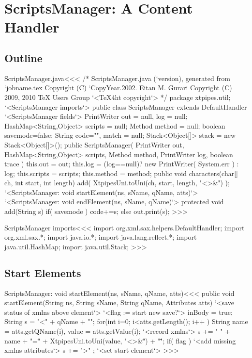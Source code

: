 \documentclass{article}
\begin{document}
\section{ScriptsManager: A Content Handler}

\label{ScriptsManager}


\subsection{Outline}


\<ScriptsManager.java\><<<
/* ScriptsManager.java (`version), generated from `jobname.tex
   Copyright (C) `CopyYear.2002. Eitan M. Gurari
   Copyright (C) 2009, 2010 TeX Users Group
`<TeX4ht copyright`> */
package xtpipes.util;
`<ScriptsManager imports`>
public class ScriptsManager extends DefaultHandler {
     `<ScriptsManager fields`>
     PrintWriter out = null, log = null;
     HashMap<String,Object> scripts = null;
     Method method = null;
     boolean savemode=false;
     String code="", match = null;
     Stack<Object[]> stack = new Stack<Object[]>();
   public ScriptsManager( PrintWriter out,
                          HashMap<String,Object> scripts,
                          Method method,
                          PrintWriter log, boolean trace ){
     this.out = out;
     this.log = (log==null)? new PrintWriter( System.err ) : log;
     this.scripts = scripts;
     this.method = method;
   }
   public void characters(char[] ch, int start, int length){
     add( XtpipesUni.toUni(ch, start, length, "<>&") );
   }
   `<ScriptsManager: void startElement(ns, sName, qName, atts)`>
   `<ScriptsManager: void endElement(ns, sName, qName)`>
   protected void add(String s){
      if( savemode ){ code+=s; }
      else { out.print(s); }
}  }
>>>


\<ScriptsManager imports\><<<
import org.xml.sax.helpers.DefaultHandler;
import org.xml.sax.*;
import java.io.*;
import java.lang.reflect.*;
import java.util.HashMap;
import java.util.Stack;
>>>

\subsection{Start Elements}




\<ScriptsManager: void startElement(ns, sName, qName, atts)\><<<
public void startElement(String ns, String sName,
                        String qName, Attributes atts) {
   `<save status of xmlns above element`>
   `<flag := start new save?`>
   inBody = true;
   String s =  "<" + qName + "\n";
   for(int i=0; i<atts.getLength(); i++ ){
      String name = atts.getQName(i),
             value = atts.getValue(i);
      `<record xmlns`>
      s += " " + name + "=\"" +
         XtpipesUni.toUni(value, "<>&\"") + "\"";
   }
   if( flag ){ `<add missing xmlns attributes`> }
   s += ">" ;
   `<set start element`>
}
>>>
\end{document}
